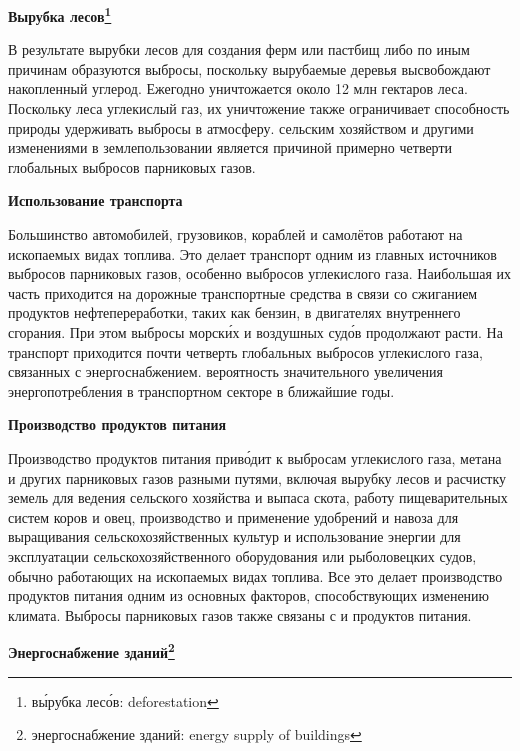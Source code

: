 \textbf{Вырубка лесов\footnote{в\'{ы}рубка лес\'{о}в: deforestation}}

В результате вырубки лесов для создания ферм или пастбищ либо по иным причинам образуются выбросы, поскольку вырубаемые деревья высвобождают накопленный углерод. Ежегодно уничтожается около 12 млн гектаров леса. Поскольку леса  углекислый газ, их уничтожение также ограничивает способность природы удерживать выбросы в атмосферу.   сельским хозяйством и другими изменениями в землепользовании является причиной примерно четверти глобальных выбросов парниковых газов.

\textbf{Использование транспорта}

Большинство автомобилей, грузовиков, кораблей и самолётов работают на ископаемых видах топлива. Это делает транспорт одним из главных источников выбросов парниковых газов, особенно выбросов углекислого газа. Наибольшая их часть приходится на дорожные транспортные средства в связи со сжиганием продуктов нефтепереработки, таких как бензин, в двигателях внутреннего сгорания. При этом выбросы морск\'{и}х и воздушных суд\'{о}в продолжают расти. На транспорт приходится почти четверть глобальных выбросов углекислого газа, связанных с энергоснабжением.   вероятность значительного увеличения энергопотребления в транспортном секторе в ближайшие годы.

\textbf{Производство продуктов питания}

Производство продуктов питания прив\'{о}дит к выбросам углекислого газа, метана и других парниковых газов разными путями, включая вырубку лесов и расчистку земель для ведения сельского хозяйства и выпаса скота, работу пищеварительных систем коров и овец, производство и применение удобрений и навоза для выращивания сельскохозяйственных культур и использование энергии для эксплуатации сельскохозяйственного оборудования или рыболовецких судов, обычно работающих на ископаемых видах топлива. Все это делает производство продуктов питания одним из основных факторов, способствующих изменению климата. Выбросы парниковых газов также связаны с  и  продуктов питания.

\textbf{Энергоснабжение зданий\footnote{энергоснабжение зданий: energy supply of buildings}}

